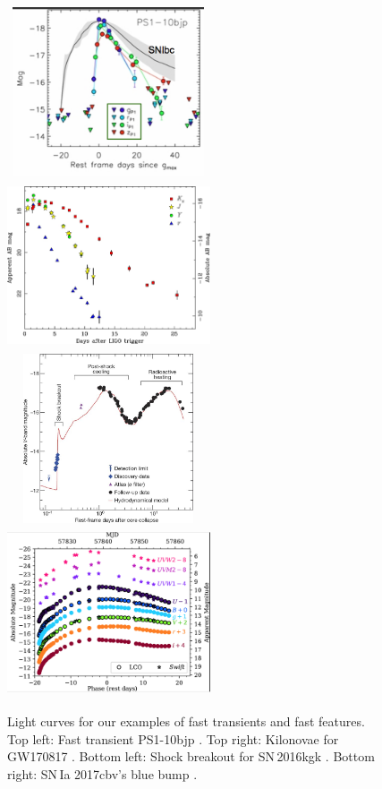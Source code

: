 \documentclass[12pt, letterpaper]{article}
\begin{document}
\begin{center}
\begin{figure}[!h]
\includegraphics[width=6cm,height=5cm]{figures/Drout_PS1-10bjp.png}
\includegraphics[width=6cm,height=5cm]{figures/Tanvir_fig2.jpg}
\includegraphics[width=6cm,height=5cm]{figures/Bersten_16kgk.jpg}
\includegraphics[width=6cm,height=5cm]{figures/Hosseinzadeh_17cbv.png}
\caption{Light curves for our examples of fast transients and fast features. Top left: Fast transient PS1-10bjp \citep{2014ApJ...794...23D}. Top right: Kilonovae for GW170817 \citep{2017ApJ...848L..27T}. Bottom left: Shock breakout for SN\,2016kgk \citep{2018Natur.554..497B}. Bottom right: SN\,Ia 2017cbv's blue bump \citep{2017ApJ...845L..11H}. }
\end{figure}
\end{center}
\end{document}
